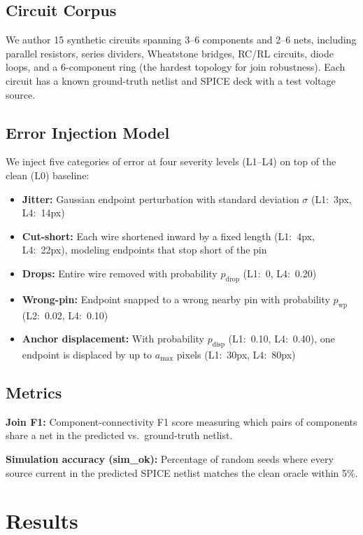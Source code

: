 \documentclass[conference]{IEEEtran}
\begin{document}
\subsection{Circuit Corpus}

We author 15 synthetic circuits spanning 3--6 components and 2--6 nets, including parallel resistors, series dividers, Wheatstone bridges, RC/RL circuits, diode loops, and a 6-component ring (the hardest topology for join robustness). Each circuit has a known ground-truth netlist and SPICE deck with a test voltage source.

\subsection{Error Injection Model}

We inject five categories of error at four severity levels (L1--L4) on top of the clean (L0) baseline:

\begin{itemize}
\item \textbf{Jitter:} Gaussian endpoint perturbation with standard deviation $\sigma$ (L1:~3px, L4:~14px)
\item \textbf{Cut-short:} Each wire shortened inward by a fixed length (L1:~4px, L4:~22px), modeling endpoints that stop short of the pin
\item \textbf{Drops:} Entire wire removed with probability $p_{\text{drop}}$ (L1:~0, L4:~0.20)
\item \textbf{Wrong-pin:} Endpoint snapped to a wrong nearby pin with probability $p_{\text{wp}}$ (L2:~0.02, L4:~0.10)
\item \textbf{Anchor displacement:} With probability $p_{\text{disp}}$ (L1:~0.10, L4:~0.40), one endpoint is displaced by up to $a_{\max}$ pixels (L1:~30px, L4:~80px)
\end{itemize}

\subsection{Metrics}

\textbf{Join F1:} Component-connectivity F1 score measuring which pairs of components share a net in the predicted vs.\ ground-truth netlist.

\textbf{Simulation accuracy (sim\_ok):} Percentage of random seeds where every source current in the predicted SPICE netlist matches the clean oracle within 5\%.

\section{Results}
\end{document}
